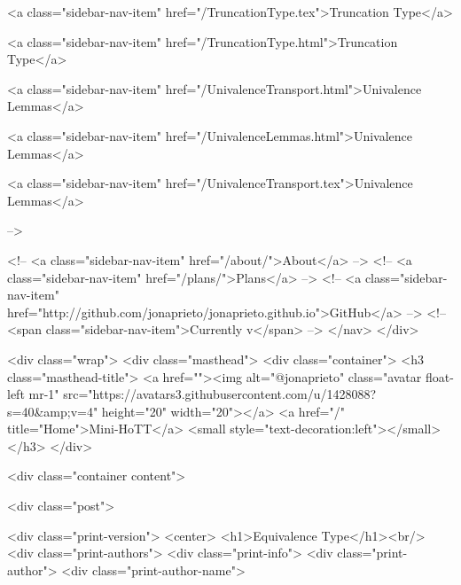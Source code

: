       
    
      
        
          <a class="sidebar-nav-item" href="/TruncationType.tex">Truncation Type</a>
        
      
    
      
        
          <a class="sidebar-nav-item" href="/TruncationType.html">Truncation Type</a>
        
      
    
      
        
          <a class="sidebar-nav-item" href="/UnivalenceTransport.html">Univalence Lemmas</a>
        
      
    
      
        
          <a class="sidebar-nav-item" href="/UnivalenceLemmas.html">Univalence Lemmas</a>
        
      
    
      
        
          <a class="sidebar-nav-item" href="/UnivalenceTransport.tex">Univalence Lemmas</a>
        
      
     -->

    <!-- <a class="sidebar-nav-item" href="/about/">About</a> -->
    <!-- <a class="sidebar-nav-item" href="/plans/">Plans</a> -->
    <!-- <a class="sidebar-nav-item" href="http://github.com/jonaprieto/jonaprieto.github.io">GitHub</a> -->
    <!-- <span class="sidebar-nav-item">Currently v</span> -->
  </nav>
</div>

    <div class="wrap">
      <div class="masthead">
        <div class="container">
          <h3 class="masthead-title">
            <a href=""><img alt="@jonaprieto" class="avatar float-left mr-1" src="https://avatars3.githubusercontent.com/u/1428088?s=40&amp;v=4" height="20" width="20"></a>
            <a href="/" title="Home">Mini-HoTT</a>
            <small style="text-decoration:left"></small>
          </h3>
        </div>
      
      <div class="container content">
        







<div class="post">

  <div class="print-version">
    <center>
      <h1>Equivalence Type</h1><br/>
        <div class="print-authors">
          <div class="print-info">
            <div class="print-author">
              <div class="print-author-name">
                
